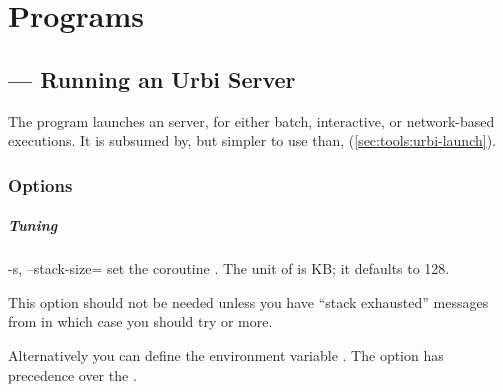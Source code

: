 \chapter{Programs}
\label{sec:tools}

\section{ --- Running an Urbi Server}
\label{sec:tools:urbi}

The  program launches an \urbi server, for either batch,
interactive, or network-based executions.  It is subsumed by, but
simpler to use than, 
(\autoref{sec:tools:urbi-launch}).

\subsection{Options}

\paragraph{Tuning}
\begin{options}
\item[-s, --stack-size=\var{size}] set the coroutine .
  The unit of  is KB; it defaults to 128.

  This option should not be needed unless you have ``stack exhausted''
  messages from  in which case you should try
   or more.

  Alternatively you can define the environment variable
  .  The option  has
  precedence over the .
\end{options}

